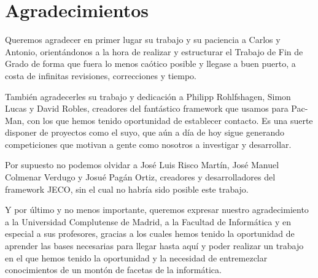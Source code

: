 \chapter{Agradecimientos} \label{cap:agradecimientos}
Queremos agradecer en primer lugar su trabajo y su paciencia a Carlos y Antonio, orientándonos a la hora de realizar y estructurar el Trabajo de Fin de Grado de forma que fuera lo menos caótico posible y llegase a buen puerto, a costa de infinitas revisiones, correcciones y tiempo.
 
También agradecerles su trabajo y dedicación a Philipp Rohlfshagen, Simon Lucas y David Robles, creadores del fantástico framework que usamos para Pac-Man, con los que hemos tenido oportunidad de establecer contacto. Es una suerte disponer de proyectos como el suyo, que aún a día de hoy sigue generando competiciones que motivan a gente como nosotros a investigar y desarrollar.
 
Por supuesto no podemos olvidar a José Luis Risco Martín, José Manuel Colmenar Verdugo y Josué Pagán Ortiz, creadores y desarrolladores del framework  JECO, sin el cual no habría sido posible este trabajo.
 
Y por último y no menos importante, queremos expresar nuestro agradecimiento a la Universidad Complutense de Madrid, a la Facultad de Informática y en especial a sus profesores, gracias a los cuales hemos tenido la oportunidad de aprender las bases necesarias para llegar hasta aquí y poder realizar un trabajo en el que hemos tenido la oportunidad y la necesidad de entremezclar conocimientos de un montón de facetas de la informática.

